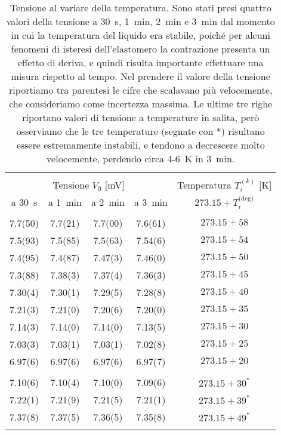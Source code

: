 \begin{table}
    \footnotesize
    \centering
    \caption{Tensione al variare della temperatura. Sono stati presi quattro valori della tensione a 30~s, 1~min, 2~min e 3~min dal momento in cui la temperatura del liquido era stabile, poiché per alcuni fenomeni di isteresi dell'elastomero la contrazione presenta un effetto di deriva, e quindi risulta importante effettuare una misura rispetto al tempo. Nel prendere il valore della tensione riportiamo tra parentesi le cifre che scalavano più velocemente, che consideriamo come incertezza massima. Le ultime tre righe riportano valori di tensione a temperature in salita, però osserviamo che le tre temperature (segnate con *) risultano essere estremamente instabili, e tendono a decrescere molto velocemente, perdendo circa 4-6~K in 3~min.}
    \label{table:p2}
    \begin{tabular}{ccccc}
        \hline\hline\\[-1.5ex]
        \multicolumn{4}{c}{Tensione $V_0$ [mV]} & Temperatura $T_i^{(k)}$ [K] \\[+0.5ex]
        a 30~s  & a 1~min & a 2~min & a 3~min   & $273.15+T_i^{\text{(deg)}}$ \\[+0.5ex] \hline \\[-1.5ex]
        7.7(50) & 7.7(21) & 7.7(00) & 7.6(61)   & $273.15+58$                 \\[+0.5ex]
        7.5(93) & 7.5(85) & 7.5(63) & 7.54(6)   & $273.15+54$                 \\[+0.5ex]
        7.4(95) & 7.4(87) & 7.47(3) & 7.46(0)   & $273.15+50$                 \\[+0.5ex]
        7.3(88) & 7.38(3) & 7.37(4) & 7.36(3)   & $273.15+45$                 \\[+0.5ex]
        7.30(4) & 7.30(1) & 7.29(5) & 7.28(8)   & $273.15+40$                 \\[+0.5ex]
        7.21(3) & 7.21(0) & 7.20(6) & 7.20(0)   & $273.15+35$                 \\[+0.5ex]
        7.14(3) & 7.14(0) & 7.14(0) & 7.13(5)   & $273.15+30$                 \\[+0.5ex]
        7.03(3) & 7.03(1) & 7.03(1) & 7.02(8)   & $273.15+25$                 \\[+0.5ex]
        6.97(6) & 6.97(6) & 6.97(6) & 6.97(7)   & $273.15+20$                 \\[+0.5ex] \hline \\[-1.5ex]
        7.10(6) & 7.10(4) & 7.10(0) & 7.09(6)   & $273.15+30^*$               \\[+0.5ex]
        7.22(1) & 7.21(9) & 7.21(5) & 7.21(1)   & $273.15+39^*$               \\[+0.5ex]
        7.37(8) & 7.37(5) & 7.36(5) & 7.35(8)   & $273.15+49^*$               \\[+0.5ex] \hline \\[-1.5ex]
    \end{tabular}
\end{table}